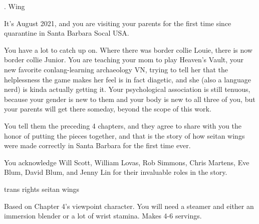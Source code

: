 \documentclass[12pt]{article}
\newcommand\chapter[2]{{\thispagestyle{empty} \Large \sc #1. \quad #2

\vspace{1.5em}}}
\begin{document}
\newpage \thispagestyle{empty}

\chapter{5}{Wing}

It's August 2021, and you are visiting your parents for the first time since quarantine in Santa Barbara Socal USA.

You have a lot to catch up on.
Where there was border collie Louie, there is now border collie Junior.
You are teaching your mom to play Heaven's Vault,
your new favorite conlang-learning archaeology VN,
trying to tell her that the helplessness the game makes her feel is in fact diagetic,
and she (also a language nerd) is kinda actually getting it.
%
Your psychological association is still tenuous,
because your gender is new to them and your body is new to all three of you,
but your parents will get there someday, beyond the scope of this work.

You tell them the preceding 4 chapters,
and they agree to share with you the honor of putting the pieces together,
and that is the story of how seitan wings were made correctly in Santa Barbara for the first time ever.

\vspace{24em}

\noindent You acknowledge Will Scott, William Lovas, Rob Simmons, Chris Martens, Eve Blum, David Blum, and Jenny Lin for their invaluable roles in the story.

\newpage \thispagestyle{empty}

\begin{center}
	{\sc \Large trans rights seitan wings}
\end{center}

Based on Chapter 4's viewpoint character.
You will need a steamer and either an immersion blender or a lot of wrist stamina.
Makes 4-6 servings.

\vspace{1em}
\end{document}
